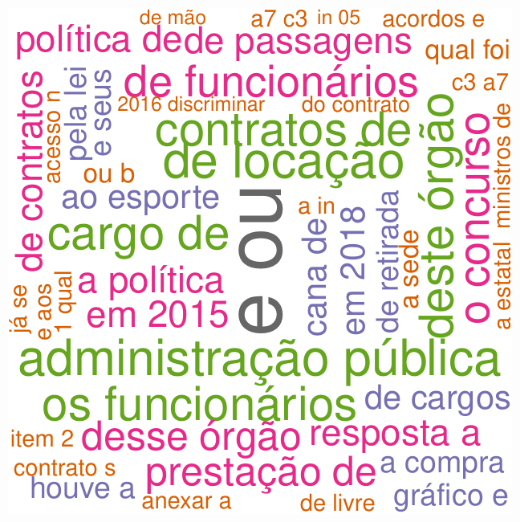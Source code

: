 \documentclass[]{article}
\begin{document}
\includegraphics{markdown_v40_files/figure-latex/wordcloud_onegram_DIR05_semstopwords-1.pdf}
\end{document}
